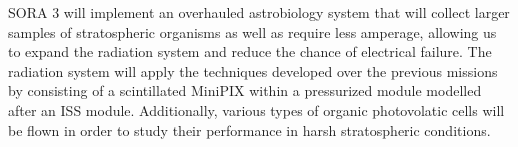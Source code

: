 \label{sec:Hardware}

SORA 3 will implement an overhauled astrobiology system that will collect larger samples of stratospheric organisms as well as require less amperage, allowing us to expand the radiation system and reduce the chance of electrical failure. The radiation system will apply the techniques developed over the previous missions by consisting of a scintillated MiniPIX within a pressurized module modelled after an ISS module. Additionally, various types of organic photovolatic cells will be flown in order to study their performance in harsh stratospheric conditions.
